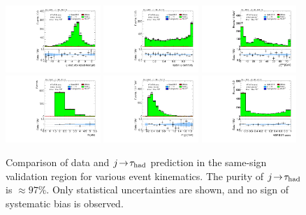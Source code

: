 \begin{figure}[tp]
  \includegraphics[width=0.32\textwidth]{figures/analysis/vbf-SSXCR/jets-etaprod} 
  \includegraphics[width=0.32\textwidth]{figures/analysis/vbf-SSXCR/lep-eta-centrality}
  \includegraphics[width=0.32\textwidth]{figures/analysis/vbf-SSXCR/system-pt} \\
  \includegraphics[width=0.32\textwidth]{figures/analysis/vbf-SSXCR/n-jets30}
  \includegraphics[width=0.32\textwidth]{figures/analysis/vbf-SSXCR/dijet-m-veryhigh}
  \includegraphics[width=0.32\textwidth]{figures/analysis/vbf-SSXCR/BDTEve-VBF} \\
  \caption{Comparison of data and $j\!\rightarrow\!\tau_\text{had}$ prediction in the same-sign validation region for various event kinematics. The purity of $j\!\rightarrow\!\tau_\text{had}$ is $\approx\! 97\%$. Only statistical uncertainties are shown, and no sign of systematic bias is observed.}
  \label{fig:backgrounds-SSXCR-jets}
\end{figure}

